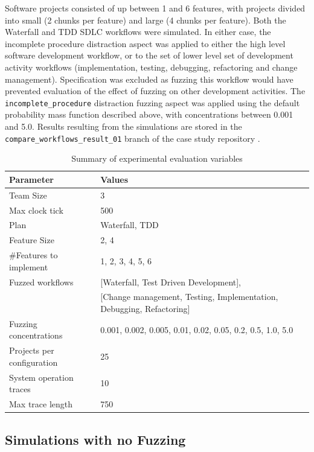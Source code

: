 \documentclass{llncs}
\begin{document}
Software projects consisted of up between 1 and 6 features, with projects divided into small (2 chunks per feature) and
large (4 chunks per feature). Both the Waterfall and TDD SDLC workflows were simulated.  In either case, the
incomplete procedure distraction aspect was applied to either the high level software development workflow, or to the
set of lower level set of development activity workflows (implementation, testing, debugging, refactoring and change
management).  Specification was excluded as fuzzing this workflow would have prevented evaluation of the effect of
fuzzing on other development activities.  The \lstinline!incomplete_procedure! distraction fuzzing aspect was applied
using the default probability mass function described above, with concentrations between 0.001 and 5.0.  Results
resulting from the simulations are stored in the \lstinline!compare_workflows_result_01! branch of the case study
repository \citep{storer2016softdev-workflow-scm}.

\begin{table}
  \centering
\begin{tabular}{|l|l|}\hline
Parameter & Values\\ \hline
Team Size & 3\\
Max clock tick & 500\\
Plan & Waterfall, TDD\\
Feature Size & 2, 4\\
\#Features to implement & 1, 2, 3, 4, 5, 6\\
Fuzzed workflows & [Waterfall, Test Driven Development],\\
& [Change management, Testing, Implementation, Debugging, Refactoring]\\
Fuzzing concentrations & 0.001, 0.002, 0.005, 0.01, 0.02, 0.05, 0.2, 0.5, 1.0, 5.0 \\
Projects per configuration & 25 \\
System operation traces & 10\\
Max trace length & 750\\ \hline
\end{tabular}

\caption{Summary of experimental evaluation variables}
\label{tab:variables}
\end{table}


\subsection{Simulations with no Fuzzing}
\end{document}

